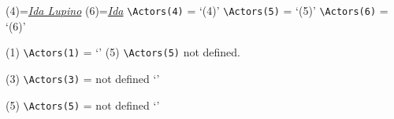 \documentclass[12pt]{article}
\begin{document}
\newarray\IdArray
\newarray\ContentArray


\newcommand{\IdArraySize}{5}

\begin{description}
 \multido{\iIds=1+1}{\IdArraySize}{
  \item[\IdArray(\iIds)] : \ContentArray(\iIds)
 }
\end{description}

\newarray\Actors
{}
\Actors(4)={\textit{\underline{Ida Lupino}}}
\Actors(6)={\textit{\underline{Ida}}}
\verb+\Actors(4)+ = ‘\Actors(4)’
\verb+\Actors(5)+ = ‘\Actors(5)’
\verb+\Actors(6)+ = ‘\Actors(6)’

\checkActors(1)%
\verb+\Actors(1)+ = ‘\cachedata’
\checkActors(5)%
\ifemptydata
\verb+\Actors(5)+ not defined.
\fi

\newcommand{\IsEmptyElement}[2]{%
  \ifemptydata
    #1
  \else
    #2
  \fi
}
\checkActors(3)%
\verb+\Actors(3)+ = \IsEmptyElement{not defined}{‘\cachedata’}
\checkActors(5)%
\verb+\Actors(5)+ = \IsEmptyElement{not defined}{‘\cachedata’}
\end{document}
